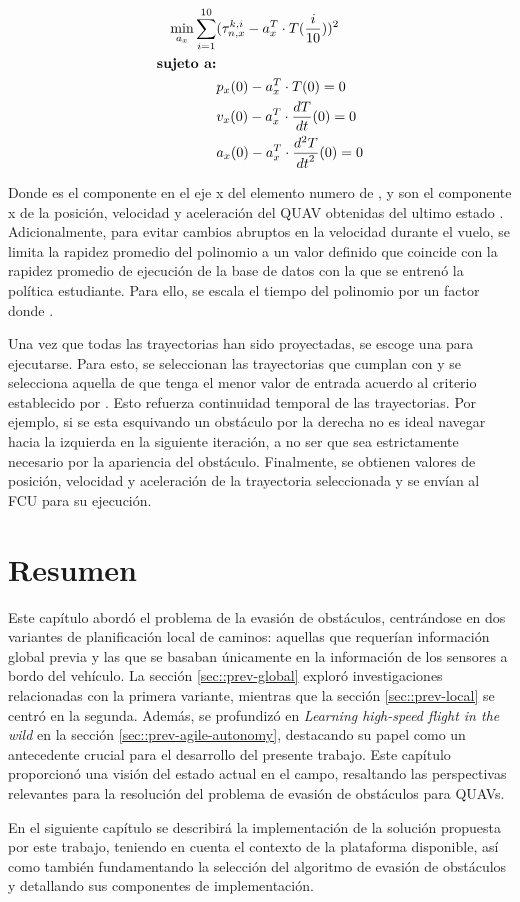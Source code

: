 \begin{equation}
\label{eq:aoa-traj-proj}
\begin{split}
    \min_{a_x} \sum_{i=1}^{10} & (\tau_{n,x}^{k,i} - a_x^T \cdot T(\frac{i}{10}))^{2} \\
    \text{\textbf{sujeto a:}} & \\
                     & p_x(0) - a_x^T \cdot T(0) = 0 \\
                     & v_x(0) - a_x^T \cdot \frac{dT}{dt}(0) = 0 \\
                     & a_x(0) - a_x^T \cdot \frac{d^2 T}{{dt}^2}(0) = 0 \\
\end{split}
\end{equation}

Donde  es el componente en el eje x del elemento numero  de , y  son el componente x de la posición, velocidad y aceleración del QUAV obtenidas del ultimo estado . Adicionalmente, para evitar cambios abruptos en la velocidad durante el vuelo, se limita la rapidez promedio del polinomio a un valor definido  que coincide con la rapidez promedio de ejecución de la base de datos con la que se entrenó la política estudiante. Para ello, se escala el tiempo  del polinomio  por un factor  donde .

Una vez que todas las trayectorias han sido proyectadas, se escoge una para ejecutarse. Para esto, se seleccionan las trayectorias que cumplan con  y se selecciona aquella de que tenga el menor valor de entrada acuerdo al criterio establecido por \cite{mellinger2011minimum}. Esto refuerza continuidad temporal de las trayectorias. Por ejemplo, si se esta esquivando un obstáculo por la derecha no es ideal navegar hacia la izquierda en la siguiente iteración, a no ser que sea estrictamente necesario por la apariencia del obstáculo. Finalmente, se obtienen valores de posición, velocidad y aceleración de la trayectoria seleccionada y se envían al FCU para su ejecución.

\section{Resumen}

Este capítulo abordó el problema de la evasión de obstáculos, centrándose en dos variantes de planificación local de caminos: aquellas que requerían información global previa y las que se basaban únicamente en la información de los sensores a bordo del vehículo. La sección \ref{sec::prev-global} exploró investigaciones relacionadas con la primera variante, mientras que la sección \ref{sec::prev-local} se centró en la segunda. Además, se profundizó en \textit{Learning high-speed flight in the wild} en la sección \ref{sec::prev-agile-autonomy}, destacando su papel como un antecedente crucial para el desarrollo del presente trabajo. Este capítulo proporcionó una visión del estado actual en el campo, resaltando las perspectivas relevantes para la resolución del problema de evasión de obstáculos para QUAVs.

En el siguiente capítulo se describirá la implementación de la solución propuesta por este trabajo, teniendo en cuenta el contexto de la plataforma disponible, así como también fundamentando la selección del algoritmo de evasión de obstáculos y detallando sus componentes de implementación.
    
   